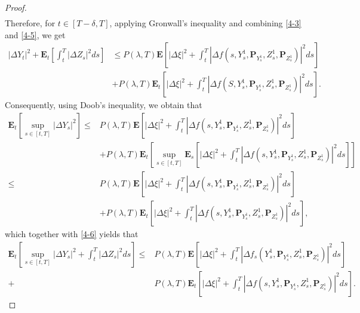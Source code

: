 \documentclass[10pt,a4paper]{amsart}
\def \E{\mathbf{E}}
\def \P{\mathbf{P}}
\begin{document}
\begin{proof}
\begin{equation}
\begin{split}
     \end{split}
 \end{equation}
 Therefore, for $t\in [T-\delta,T]$, applying Gronwall's inequality and combining \eqref{4-3} and \eqref{4-5}, we get 
  \begin{equation}
     \begin{split}\label{4-6}
        \left|\Delta Y_t\right|^2+\E_t\left[\int_{t}^{T}\left|\Delta Z_s\right|^2 ds\right]
         &\leq P(\lambda,T)\E\left[\left|\Delta\xi\right|^2+\int_{t}^{T}\left|\Delta f(s,Y_s^1,\P_{Y_s^1},Z_s^1,\P_{Z_s^1})\right|^2ds\right]\\
         &+ P(\lambda,T)\E_t\left[\left|\Delta\xi\right|^2+\int_{t}^{T}\left|\Delta f(S,Y_s^1,\P_{Y_s^1},Z_s^1,\P_{Z_s^1})\right|^2ds\right].
     \end{split}
 \end{equation}
 Consequently, using Doob's inequality, we obtain that 
 \begin{equation*}
     \begin{split}\label{4-7}
        \E_t\left[\sup_{s\in[t,T]}\left|\Delta Y_s\right|^2\right]
         \leq& P(\lambda,T)\E\left[\left|\Delta\xi\right|^2+\int_{t}^{T}\left|\Delta f(s,Y_s^1,\P_{Y_s^1},Z_s^1,\P_{Z_s^1})\right|^2ds\right]\\
         &+ P(\lambda,T)\E_t\left[\sup_{s\in[t,T]}\E_s\left[\left|\Delta\xi\right|^2+\int_{t}^{T}\left|\Delta f(s,Y_s^1,\P_{Y_s^1},Z_s^1,\P_{Z_s^1})\right|^2ds\right]\right]\\
         \leq& P(\lambda,T)\E\left[\left|\Delta\xi\right|^2+\int_{t}^{T}\left|\Delta f(s,Y_s^1,\P_{Y_s^1},Z_s^1,\P_{Z_s^1})\right|^2ds\right]\\
         &+ P(\lambda,T)\E_t\left[ \left|\Delta\xi\right|^2+\int_{t}^{T}\left|\Delta f(s,Y_s^1,\P_{Y_s^1},Z_s^1,\P_{Z_s^1})\right|^2ds\right],
     \end{split}
 \end{equation*}
 which together with \eqref{4-6} yields that 
 \begin{equation}
     \begin{split}\label{4-8}
        \E_t\left[\sup_{s\in[t,T]}\left|\Delta Y_s\right|^2+\int_{t}^{T}\left|\Delta Z_s\right|^2 ds\right]
         \leq& P(\lambda,T)\E\left[\left|\Delta\xi\right|^2+\int_{t}^{T}\left|\Delta f_s(Y_s^1,\P_{Y_s^1},Z_s^1,\P_{Z_s^1})\right|^2ds\right]\\
         +& P(\lambda,T)\E_t\left[\left|\Delta\xi\right|^2+\int_{t}^{T}\left|\Delta f(s,Y_s^1,\P_{Y_s^1},Z_s^1,\P_{Z_s^1})\right|^2ds\right].
     \end{split}

\end{equation}
\end{proof}
\end{document}

